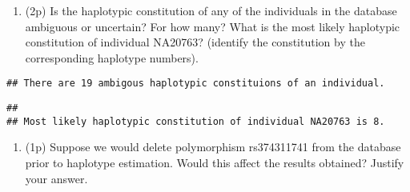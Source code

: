 \documentclass[
]{article}
\newenvironment{Shaded}{\begin{snugshade}}{\end{snugshade}}
\newcommand{\CharTok}[1]{\textcolor[rgb]{0.31,0.60,0.02}{#1}}
\newcommand{\DataTypeTok}[1]{\textcolor[rgb]{0.13,0.29,0.53}{#1}}
\newcommand{\DecValTok}[1]{\textcolor[rgb]{0.00,0.00,0.81}{#1}}
\newcommand{\KeywordTok}[1]{\textcolor[rgb]{0.13,0.29,0.53}{\textbf{#1}}}
\newcommand{\NormalTok}[1]{#1}
\newcommand{\OperatorTok}[1]{\textcolor[rgb]{0.81,0.36,0.00}{\textbf{#1}}}
\newcommand{\StringTok}[1]{\textcolor[rgb]{0.31,0.60,0.02}{#1}}
\providecommand{\tightlist}{%
  \setlength{\itemsep}{0pt}\setlength{\parskip}{0pt}}
\begin{document}
\begin{enumerate}
\def\labelenumi{\arabic{enumi}.}
\setcounter{enumi}{4}
\tightlist
\item
  (2p) Is the haplotypic constitution of any of the individuals in the
  database ambiguous or uncertain? For how many? What is the most likely
  haplotypic constitution of individual NA20763? (identify the
  constitution by the corresponding haplotype numbers).
\end{enumerate}

\begin{Shaded}
\end{Shaded}

\begin{verbatim}
## There are 19 ambigous haplotypic constituions of an individual.
\end{verbatim}

\begin{Shaded}
\end{Shaded}

\begin{verbatim}
## 
## Most likely haplotypic constitution of individual NA20763 is 8.
\end{verbatim}

\begin{enumerate}
\def\labelenumi{\arabic{enumi}.}
\setcounter{enumi}{5}
\tightlist
\item
  (1p) Suppose we would delete polymorphism rs374311741 from the
  database prior to haplotype estimation. Would this affect the results
  obtained? Justify your answer.
\end{enumerate}
\end{document}
